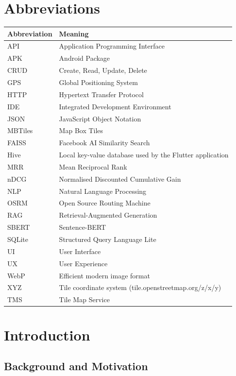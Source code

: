 \documentclass[12pt,a4paper,oneside]{report}
\begin{document}
\chapter*{Abbreviations}
\begin{table}[h]
\centering
\begin{tabular}{ll}
\toprule
\textbf{Abbreviation} & \textbf{Meaning} \\
\midrule
API & Application Programming Interface \\
APK & Android Package \\
CRUD & Create, Read, Update, Delete \\
GPS & Global Positioning System \\
HTTP & Hypertext Transfer Protocol \\
IDE & Integrated Development Environment \\
JSON & JavaScript Object Notation \\
MBTiles & Map Box Tiles \\
FAISS & Facebook AI Similarity Search \\
Hive & Local key-value database used by the Flutter application \\
MRR & Mean Reciprocal Rank \\
nDCG & Normalised Discounted Cumulative Gain \\
NLP & Natural Language Processing \\
OSRM & Open Source Routing Machine \\
RAG & Retrieval-Augmented Generation \\
SBERT & Sentence-BERT \\
SQLite & Structured Query Language Lite \\
UI & User Interface \\
UX & User Experience \\
WebP & Efficient modern image format \\
XYZ & Tile coordinate system (tile.openstreetmap.org/{z}/{x}/{y}) \\
TMS & Tile Map Service \\
\bottomrule
\end{tabular}
\end{table}

\newpage
\clearpage
{}
\chapter{Introduction}
\label{ch:introduction}

\section{Background and Motivation}
\label{sec:background}
\end{document}
